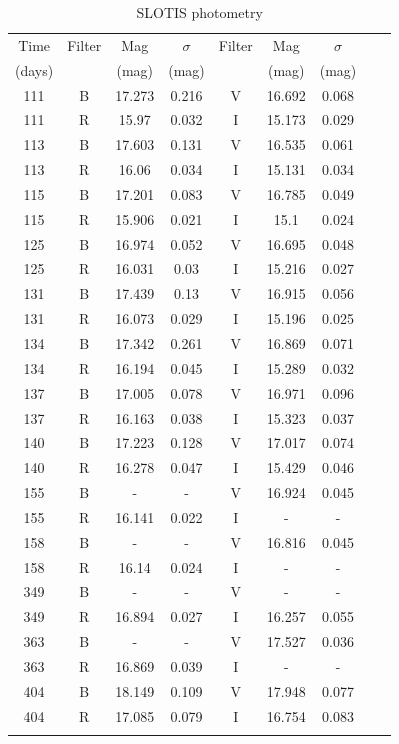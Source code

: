 \documentclass[iop]{emulateapj}
\begin{document}
\begin{table}\begin{center}\begin{minipage}{3.25in}
      \caption{SLOTIS photometry}
\centering
\scriptsize
\tighten
\begin{tabular}{@{}ccccccccc}\hline\hline
Time &Filter &Mag &$\sigma$ &Filter &Mag &$\sigma$ \\
(days) & &(mag) &(mag) & &(mag) &(mag) \\
\hline
111 &B &17.273 &0.216 &V &16.692 &0.068 \\
111 &R &15.97  &0.032 &I &15.173 &0.029 \\
113 &B &17.603 &0.131 &V &16.535 &0.061 \\
113 &R &16.06  &0.034 &I &15.131 &0.034 \\
115 &B &17.201 &0.083 &V &16.785 &0.049 \\
115 &R &15.906 &0.021 &I &15.1   &0.024 \\
125 &B &16.974 &0.052 &V &16.695 &0.048 \\
125 &R &16.031 &0.03  &I &15.216 &0.027 \\
131 &B &17.439 &0.13  &V &16.915 &0.056 \\
131 &R &16.073 &0.029 &I &15.196 &0.025 \\
134 &B &17.342 &0.261 &V &16.869 &0.071 \\
134 &R &16.194 &0.045 &I &15.289 &0.032 \\
137 &B &17.005 &0.078 &V &16.971 &0.096 \\
137 &R &16.163 &0.038 &I &15.323 &0.037 \\
140 &B &17.223 &0.128 &V &17.017 &0.074 \\
140 &R &16.278 &0.047 &I &15.429 &0.046 \\
155 &B &-      &-     &V &16.924 &0.045 \\
155 &R &16.141 &0.022 &I &-      &- \\
158 &B &-      &-     &V &16.816 &0.045 \\
158 &R &16.14  &0.024 &I &-      &- \\
349 &B &-      &-     &V &-      &- \\
349 &R &16.894 &0.027 &I &16.257 &0.055 \\
363 &B &-      &-     &V &17.527 &0.036 \\
363 &R &16.869 &0.039 &I &-      &- \\
404 &B &18.149 &0.109 &V &17.948 &0.077 \\
404 &R &17.085 &0.079 &I &16.754 &0.083 \\
\hline \\
\end{tabular}
\label{tab:slotis}
\end{minipage}\end{center}
\end{table}
\end{document}
